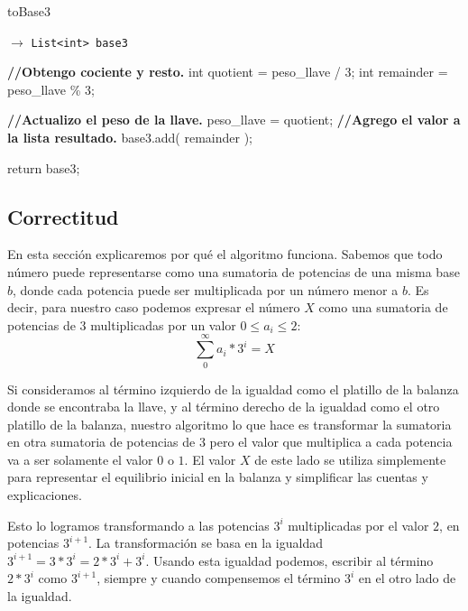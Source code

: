 \newpage

\begin{algorithm}
\caption{toBase3}
\begin{algorithmic}[1]
   $\to $ \texttt{List<int> base3}
 
		
		    \State \textbf{//Obtengo cociente y resto.}
			\State int quotient  = peso\_llave / 3;
			\State int remainder = peso\_llave \% 3;
			
			\State
			\State \textbf{//Actualizo el peso de la llave.}
			\State peso\_llave = quotient;				
			\State
			\State \textbf{//Agrego el valor a la lista resultado.}
			\State base3.add( remainder );		
		
		\EndWhile
		
		\State
		\State return base3;
	
		
		\EndProcedure
 
\end{algorithmic}
 
\end{algorithm}


\subsection{Correctitud}

En esta sección explicaremos por qué el algoritmo funciona. Sabemos que todo número puede representarse como una sumatoria de potencias de una misma base $b$, donde cada potencia puede ser multiplicada por un número menor a $b$. Es decir, para nuestro caso podemos expresar el número $X$ como una sumatoria de potencias de $3$ multiplicadas por un valor  $ 0 \leq a_i \leq 2$: 
\[
\sum_{0}^{\infty}a_i*3^i = X
\]

Si consideramos al término izquierdo de la igualdad como el platillo de la balanza donde se encontraba la llave, y al término derecho de la igualdad como el otro platillo de la balanza, nuestro algoritmo lo que hace es transformar la sumatoria en otra sumatoria de potencias de $3$ pero el valor que multiplica a cada potencia va a ser solamente el valor $0$ o $1$. El valor $X$ de este lado se utiliza simplemente para representar el equilibrio inicial en la balanza y simplificar las cuentas y explicaciones.

Esto lo logramos transformando a las potencias $3^i$ multiplicadas por el valor $2$, en potencias $3^{i+1}$. La transformación se basa en la igualdad $3^{i+1} = 3*3^i = 2*3^i + 3^i$. Usando esta igualdad podemos, escribir al término $2*3^i$ como $3^{i+1}$, siempre y cuando compensemos el término $3^i$ en el otro lado de la igualdad.

